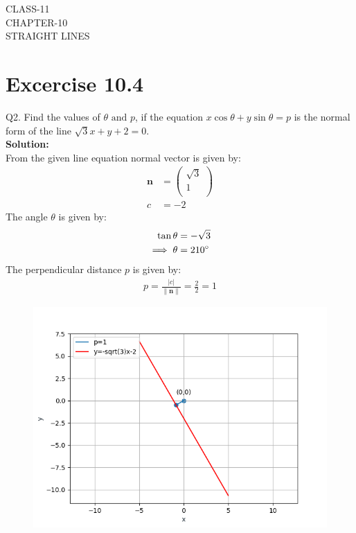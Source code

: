 \documentclass[12pt]{article}
\providecommand{\norm}[1]{\left\lVert#1\right\rVert}
\newcommand{\solution}{\noindent \textbf{Solution: }}
\newcommand{\myvec}[1]{\ensuremath{\begin{pmatrix}#1\end{pmatrix}}}
\let\vec\mathbf
\begin{document}
\begin{center}
\textbf\large{CLASS-11 \\ CHAPTER-10 \\ STRAIGHT LINES}
\end{center}
\section*{Excercise 10.4}

Q2. Find the values of $\theta \text{ and } p$, if the equation $x\cos\theta+y\sin\theta=p$ is the normal form
of the line $\sqrt{3}x+y+2=0$.
\\
\solution
\\
From the given line equation normal vector is given by:
		\begin{align}
	\vec{n}&=\myvec{\sqrt{3}\\1\\}\\
			c&=-2
		\end{align}
	The angle $\theta$ is given by:
		\begin{align}
			\tan\theta&=-\sqrt{3}\\
		\implies \theta&=210\degree
		\end{align}
	The perpendicular distance $p$ is given by:
		\begin{align}
			p=\frac{|c|}{\norm{\vec{n}}}=\frac{2}{2}=1
		\end{align}
\begin{figure}[H]
	\begin{center} 
	    \includegraphics[width=\columnwidth]{figs/line.png}
	\end{center}
\caption{}
\label{fig:Fig1}
\end{figure}
\end{document}
